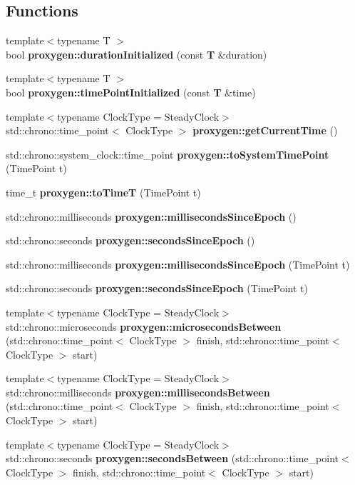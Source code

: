 \subsection*{Functions}
\begin{DoxyCompactItemize}
\item 
{\footnotesize template$<$typename T $>$ }\\bool {\bf proxygen\+::duration\+Initialized} (const {\bf T} \&duration)
\item 
{\footnotesize template$<$typename T $>$ }\\bool {\bf proxygen\+::time\+Point\+Initialized} (const {\bf T} \&time)
\item 
{\footnotesize template$<$typename Clock\+Type  = Steady\+Clock$>$ }\\std\+::chrono\+::time\+\_\+point$<$ Clock\+Type $>$ {\bf proxygen\+::get\+Current\+Time} ()
\item 
std\+::chrono\+::system\+\_\+clock\+::time\+\_\+point {\bf proxygen\+::to\+System\+Time\+Point} (Time\+Point t)
\item 
time\+\_\+t {\bf proxygen\+::to\+TimeT} (Time\+Point t)
\item 
std\+::chrono\+::milliseconds {\bf proxygen\+::milliseconds\+Since\+Epoch} ()
\item 
std\+::chrono\+::seconds {\bf proxygen\+::seconds\+Since\+Epoch} ()
\item 
std\+::chrono\+::milliseconds {\bf proxygen\+::milliseconds\+Since\+Epoch} (Time\+Point t)
\item 
std\+::chrono\+::seconds {\bf proxygen\+::seconds\+Since\+Epoch} (Time\+Point t)
\item 
{\footnotesize template$<$typename Clock\+Type  = Steady\+Clock$>$ }\\std\+::chrono\+::microseconds {\bf proxygen\+::microseconds\+Between} (std\+::chrono\+::time\+\_\+point$<$ Clock\+Type $>$ finish, std\+::chrono\+::time\+\_\+point$<$ Clock\+Type $>$ start)
\item 
{\footnotesize template$<$typename Clock\+Type  = Steady\+Clock$>$ }\\std\+::chrono\+::milliseconds {\bf proxygen\+::milliseconds\+Between} (std\+::chrono\+::time\+\_\+point$<$ Clock\+Type $>$ finish, std\+::chrono\+::time\+\_\+point$<$ Clock\+Type $>$ start)
\item 
{\footnotesize template$<$typename Clock\+Type  = Steady\+Clock$>$ }\\std\+::chrono\+::seconds {\bf proxygen\+::seconds\+Between} (std\+::chrono\+::time\+\_\+point$<$ Clock\+Type $>$ finish, std\+::chrono\+::time\+\_\+point$<$ Clock\+Type $>$ start)

\end{DoxyCompactItemize}
